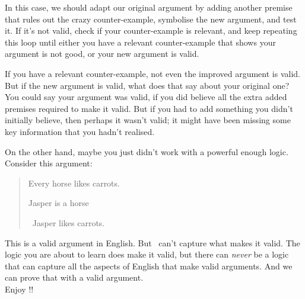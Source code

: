 \documentclass[PHIL101-Textbook.tex]{subfiles}
\begin{document}
In this case, we should adapt our original argument by adding another premise that rules out the crazy counter-example, symbolise the new argument, and test it. If it's not valid, check if your counter-example is relevant, and keep repeating this loop until either you have a relevant counter-example that shows your argument is not good, or your new argument is valid.

If you have a relevant counter-example, not even the improved argument is valid. But if the new argument is valid, what does that say about your original one? You could say your argument was valid, if you did believe all the extra added premises required to make it valid. But if you had to add something you didn't initially believe, then perhaps it wasn't valid; it might have been missing some key information that you hadn't realised.

On the other hand, maybe you just didn't work with a powerful enough logic. Consider this argument:

\begin{quotation}
	Every horse likes carrots.

	Jasper is a horse

	\therefore\ Jasper likes carrots.
\end{quotation}

\noindent This is a valid argument in English. But \tfl\ can't capture what makes it valid. The logic you are about to learn does make it valid, but there can \emph{never} be a logic that can capture all the aspects of English that make valid arguments. And we can prove that with a valid argument.\\

\indent\indent Enjoy !!
\end{document}
